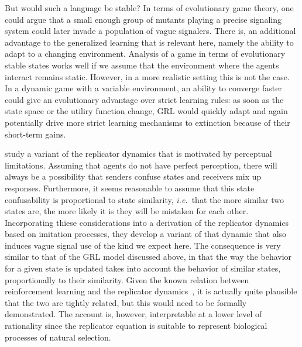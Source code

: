 \documentclass[a4paper]{article}
\begin{document}
But would such a language be stable?
In terms of evolutionary game theory, one could argue that a small enough group of mutants playing a precise signaling system could later invade a population of vague signalers.
There is, an additional advantage to the generalized learning that is relevant here, namely the ability to adapt to a changing environment.
Analysis of a game in terms of evolutionary stable states works well if we assume that the environment where the agents interact remains static.
However, in a more realistic setting this is not the case.
In a dynamic game with a variable environment, an ability to converge faster could give an evolutionary advantage over strict learning rules: as soon as the state space or the utiliry function change, GRL would quickly adapt and again potentially drive more strict learning mechanisms to extinction because of their short-term gains.


\textcite{franke_vagueness_2017} study a variant of the replicator dynamics that is motivated by perceptual limitations.
Assuming that agents do not have perfect perception, there will always be a possibility that senders confuse states and receivers mix up responses.
Furthermore, it seems reasonable to assume that this state confusability is proportional to state similarity, \emph{i.e.}~that the more similar two states are, the more likely it is they will be mistaken for each other.
Incorporating thiese considerations into a derivation of the replicator dynamics based on imitation processes, they develop a variant of that dynamic that also induces vague signal use of the kind we expect here.
The consequence is very similar to that of the GRL model discussed above, in that the way the behavior for a given state is updated takes into account the behavior of similar states, proportionally to their similarity.
Given the known relation between reinforcement learning and the replicator dynamics~\parencite{Beggs2005}, it is actually quite plausible that the two are tightly related, but this would need to be formally demonstrated.
The account is, however, interpretable at a lower level of rationality since the replicator equation is suitable to represent biological processes of natural selection.
\end{document}
